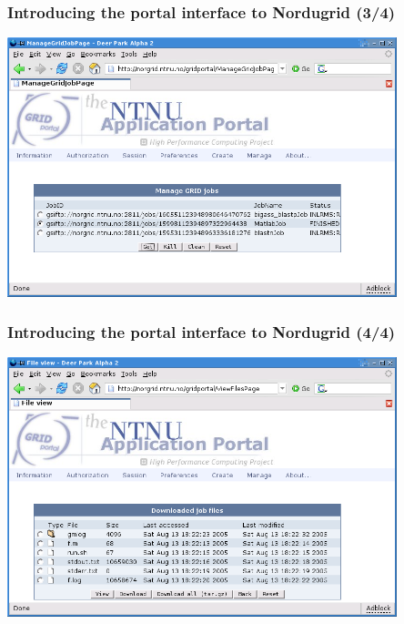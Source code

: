 \documentclass{beamer}
\begin{document}
\begin{frame}
  \frametitle{Introducing the portal interface to Nordugrid (3/4)}

	\begin{center}
		\includegraphics[width=0.85\textwidth]{portal_get.png}
	\end{center}
\end{frame}

\begin{frame}
  \frametitle{Introducing the portal interface to Nordugrid (4/4)}

	\begin{center}
		\includegraphics[width=0.85\textwidth]{portal_files.png}
	\end{center}	
\end{frame}
\end{document}
